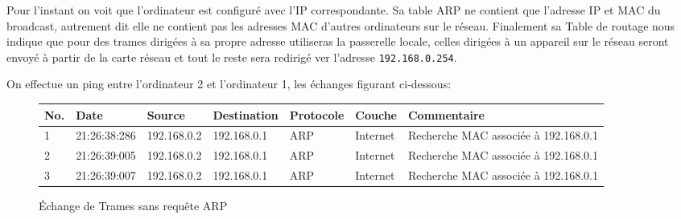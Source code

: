 \documentclass[11pt]{book}
\begin{document}
	Pour l'instant on voit que l'ordinateur est configuré avec l'IP correspondante. Sa table ARP ne contient que l'adresse IP et MAC du broadcast, autrement dit elle ne contient pas les adresses MAC d'autres ordinateurs sur le réseau. Finalement sa Table de routage nous indique que pour des trames dirigées à sa propre adresse utiliseras la passerelle locale, celles dirigées à un appareil sur le réseau seront envoyé à partir de la carte réseau et tout le reste sera redirigé ver l'adresse \texttt{192.168.0.254}.

	On effectue un ping entre l'ordinateur 2 et l'ordinateur 1, les échanges figurant ci-dessous:

	\begin{figure}[ht!]
		\begin{tabular}{|l|l|l|l|l|l|l|}
			\hline
			No. & Date & Source & Destination & Protocole & Couche & Commentaire\\
			\hline
			1 & 21:26:38:286 & 192.168.0.2 & 192.168.0.1 & ARP & Internet & Recherche MAC associée à 192.168.0.1\\
			\hline
			2 & 21:26:39:005 & 192.168.0.2 & 192.168.0.1 & ARP & Internet & Recherche MAC associée à 192.168.0.1\\
			\hline
			3 & 21:26:39:007 & 192.168.0.2 & 192.168.0.1 & ARP & Internet & Recherche MAC associée à 192.168.0.1\\
			\hline
			
		\end{tabular}
		\caption{Échange de Trames sans requête ARP}
	\end{figure}
\end{document}
